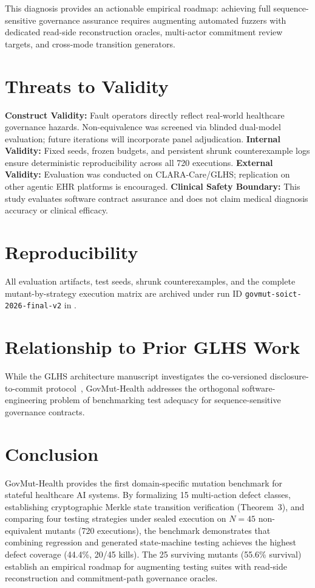 \documentclass[runningheads]{llncs}
\begin{document}
This diagnosis provides an actionable empirical roadmap: achieving full sequence-sensitive governance assurance requires augmenting automated fuzzers with dedicated read-side reconstruction oracles, multi-actor commitment review targets, and cross-mode transition generators.

\section{Threats to Validity}
\textbf{Construct Validity:} Fault operators directly reflect real-world healthcare governance hazards. Non-equivalence was screened via blinded dual-model evaluation; future iterations will incorporate panel adjudication.
\textbf{Internal Validity:} Fixed seeds, frozen budgets, and persistent shrunk counterexample logs ensure deterministic reproducibility across all 720 executions.
\textbf{External Validity:} Evaluation was conducted on CLARA-Care/GLHS; replication on other agentic EHR platforms is encouraged.
\textbf{Clinical Safety Boundary:} This study evaluates software contract assurance and does not claim medical diagnosis accuracy or clinical efficacy.

\section{Reproducibility}
All evaluation artifacts, test seeds, shrunk counterexamples, and the complete mutant-by-strategy execution matrix are archived under run ID \texttt{govmut-soict-2026-final-v2} in .

\section{Relationship to Prior GLHS Work}
While the GLHS architecture manuscript investigates the co-versioned disclosure-to-commit protocol~\cite{glhs}, GovMut-Health addresses the orthogonal software-engineering problem of benchmarking test adequacy for sequence-sensitive governance contracts.

\section{Conclusion}
GovMut-Health provides the first domain-specific mutation benchmark for stateful healthcare AI systems. By formalizing 15 multi-action defect classes, establishing cryptographic Merkle state transition verification (Theorem~3), and comparing four testing strategies under sealed execution on $N = 45$ non-equivalent mutants (720 executions), the benchmark demonstrates that combining regression and generated state-machine testing achieves the highest defect coverage (44.4\%, 20/45 kills). The 25 surviving mutants (55.6\% survival) establish an empirical roadmap for augmenting testing suites with read-side reconstruction and commitment-path governance oracles.
\end{document}
